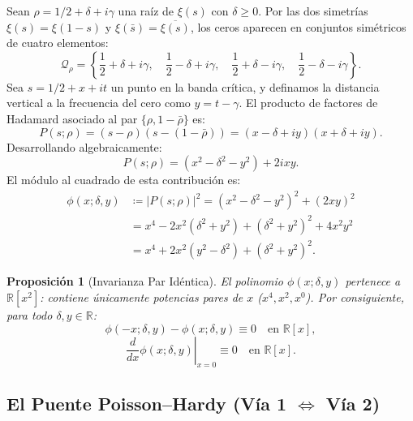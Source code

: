 \documentclass[11pt,a4paper]{article}
\newtheorem{proposition}[theorem]{Proposición}
\theoremstyle{definition}
\theoremstyle{remark}
\begin{document}
Sean $\rho = 1/2 + \delta + i\gamma$ una raíz de $\xi(s)$ con $\delta \ge 0$. Por las dos simetrías $\xi(s) = \xi(1-s)$ y $\xi(\bar{s}) = \overline{\xi(s)}$, los ceros aparecen en conjuntos simétricos de cuatro elementos:
\begin{equation}
\mathcal{Q}_\rho = \left\{ \frac{1}{2} + \delta + i\gamma, \quad \frac{1}{2} - \delta + i\gamma, \quad \frac{1}{2} + \delta - i\gamma, \quad \frac{1}{2} - \delta - i\gamma \right\}.
\end{equation}
Sea $s = 1/2 + x + it$ un punto en la banda crítica, y definamos la distancia vertical a la frecuencia del cero como $y = t - \gamma$. El producto de factores de Hadamard asociado al par $\{\rho, 1 - \bar{\rho}\}$ es:
\begin{equation}
P(s; \rho) = (s - \rho)(s - (1 - \bar{\rho})) = (x - \delta + iy)(x + \delta + iy).
\end{equation}
Desarrollando algebraicamente:
\begin{equation}
P(s; \rho) = (x^2 - \delta^2 - y^2) + 2ixy.
\end{equation}
El módulo al cuadrado de esta contribución es:
\begin{align}
\phi(x; \delta, y) &\coloneqq |P(s; \rho)|^2 = (x^2 - \delta^2 - y^2)^2 + (2xy)^2 \nonumber \\
&= x^4 - 2x^2(\delta^2 + y^2) + (\delta^2 + y^2)^2 + 4x^2y^2 \nonumber \\
&= x^4 + 2x^2(y^2 - \delta^2) + (\delta^2 + y^2)^2.
\end{align}

\begin{proposition}[Invarianza Par Idéntica]
El polinomio $\phi(x; \delta, y)$ pertenece a $\mathbb{R}[x^2]$: contiene únicamente potencias pares de $x$ ($x^4, x^2, x^0$). Por consiguiente, para todo $\delta, y \in \mathbb{R}$:
\begin{equation}
\phi(-x; \delta, y) - \phi(x; \delta, y) \equiv 0 \quad \text{en } \mathbb{R}[x],
\end{equation}
\begin{equation}
\left. \frac{d}{dx}\phi(x; \delta, y) \right|_{x=0} \equiv 0 \quad \text{en } \mathbb{R}[x].
\end{equation}
\end{proposition}

\subsection{El Puente Poisson--Hardy \texorpdfstring{(Vía 1 $\Longleftrightarrow$ Vía 2)}{(Vía 1 <=> Vía 2)}}
\end{document}
